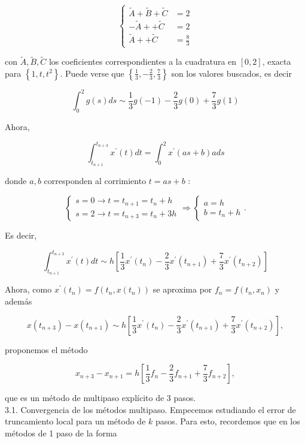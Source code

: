 \documentclass[10pt]{article}
\begin{document}
$$
\left\{\begin{aligned}
\tilde{A}+\tilde{B}+\tilde{C} & =2 \\
-\tilde{A}++\tilde{C} & =2 \\
\tilde{A}++\tilde{C} & =\frac{8}{3}
\end{aligned}\right.
$$

con $\tilde{A}, \tilde{B}, \tilde{C}$ los coeficientes correspondientes a la cuadratura en $[0,2]$, exacta para $\left\{1, t, t^{2}\right\}$. Puede verse que $\left\{\frac{1}{3},-\frac{2}{3}, \frac{7}{3}\right\}$ son los valores buscados, es decir

$$
\int_{0}^{2} g(s) d s \sim \frac{1}{3} g(-1)-\frac{2}{3} g(0)+\frac{7}{3} g(1)
$$

Ahora,

$$
\int_{t_{n+1}}^{t_{n+3}} x^{\prime}(t) d t=\int_{0}^{2} x^{\prime}(a s+b) a d s
$$

donde $a, b$ corresponden al corrimiento $t=a s+b$ :

$$
\left\{\begin{array} { l } 
{ s = 0 \rightarrow t = t _ { n + 1 } = t _ { n } + h } \\
{ s = 2 \rightarrow t = t _ { n + 3 } = t _ { n } + 3 h }
\end{array} \Rightarrow \left\{\begin{array}{l}
a=h \\
b=t_{n}+h
\end{array} .\right.\right.
$$

Es decir,

$$
\int_{t_{n+1}}^{t_{n+3}} x^{\prime}(t) d t \sim h\left[\frac{1}{3} x^{\prime}\left(t_{n}\right)-\frac{2}{3} x^{\prime}\left(t_{n+1}\right)+\frac{7}{3} x^{\prime}\left(t_{n+2}\right)\right]
$$

Ahora, como $x^{\prime}\left(t_{n}\right)=f\left(t_{n}, x\left(t_{n}\right)\right)$ se aproxima por $f_{n}=f\left(t_{n}, x_{n}\right)$ y además

$$
x\left(t_{n+3}\right)-x\left(t_{n+1}\right) \sim h\left[\frac{1}{3} x^{\prime}\left(t_{n}\right)-\frac{2}{3} x^{\prime}\left(t_{n+1}\right)+\frac{7}{3} x^{\prime}\left(t_{n+2}\right)\right],
$$

proponemos el método

$$
x_{n+3}-x_{n+1}=h\left[\frac{1}{3} f_{n}-\frac{2}{3} f_{n+1}+\frac{7}{3} f_{n+2}\right],
$$

que es un método de multipaso explícito de 3 pasos.\\
3.1. Convergencia de los métodos multipaso. Empecemos estudiando el error de truncamiento local para un método de $k$ pasos. Para esto, recordemos que en los métodos de 1 paso de la forma
\end{document}
